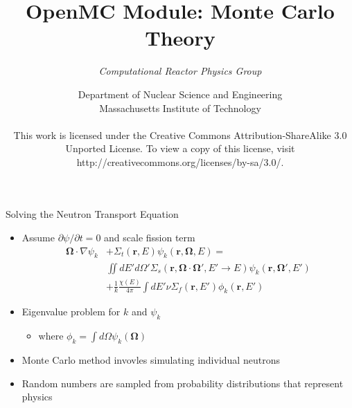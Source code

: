 \documentclass[serif]{beamer}
\title{OpenMC Module: Monte Carlo Theory}
\author{\emph{Computational Reactor Physics Group}}
\date{\normalsize Department of Nuclear Science and Engineering\\
                  Massachusetts Institute of Technology \\
~\\
\tiny{This work is licensed under the Creative Commons Attribution-ShareAlike 3.0 Unported License. To view a copy of this license, visit http://creativecommons.org/licenses/by-sa/3.0/.}}
\begin{document}

\frame{\titlepage}\logo{} %


\begin{frame}{Solving the Neutron Transport Equation}

  \begin{itemize}
    \item<1-> Assume $\partial\psi / \partial t = 0$ and scale fission term
      \begin{equation*}
        \begin{split}
          \boldsymbol{\Omega} \cdot \nabla \psi_k &+ \Sigma_t(\mathbf{r},E)
          \psi_k(\mathbf{r},\boldsymbol\Omega,E) = \\ &\iint dE' d\Omega'
          \Sigma_s(\mathbf{r},\boldsymbol\Omega\cdot\boldsymbol\Omega',E'\to
          E)\psi_k(\mathbf{r},\boldsymbol\Omega',E') \\ &+ \frac{1}{k} \frac{\chi(E)}{4\pi}
          \int dE' \nu \Sigma_f(\mathbf{r},E')\phi_k(\mathbf{r},E')
        \end{split}
      \end{equation*}\vfill
    \item<1-> Eigenvalue problem for $k$ and $\psi_k$\vfill
      \begin{itemize} \item where $\phi_k = \int d\Omega\psi_k(\boldsymbol\Omega)$ \end{itemize}
    \item<1-> Monte Carlo method invovles simulating individual neutrons\vfill
    \item<1-> Random numbers are sampled from probability distributions that
              represent physics 
  \end{itemize}

\end{frame}

\end{document}
